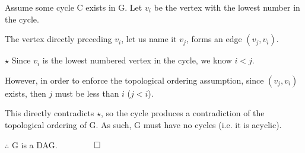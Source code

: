 \documentclass[11pt,english]{article}
\begin{document}
Assume some cycle C exists in G. Let $v_i$ be the vertex with the lowest number in the cycle.

The vertex directly preceding $v_i$, let us name it $v_j$, forms an edge $(v_j, v_i)$.

$\star$ Since $v_i$ is the lowest numbered vertex in the cycle, we know $i < j$.  

However, in order to enforce the topological ordering assumption, since $(v_j, v_i)$ exists, then $j$ must be less than $i$ ($j < i$).

This directly contradicts $\star$, so the cycle produces a contradiction of the topological ordering of G. As such, G must have no cycles (i.e. it is acyclic).

$\therefore$ G is a DAG. $\qquad \qed$
\end{document}
